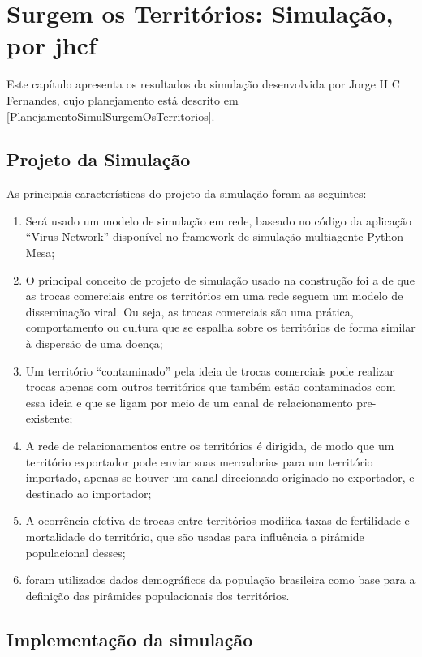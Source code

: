 \chapter{Surgem os Territórios: Simulação, por jhcf}

Este capítulo apresenta os resultados da simulação desenvolvida por Jorge H C Fernandes, cujo planejamento está descrito em \ref{PlanejamentoSimulSurgemOsTerritorios}.

\section{Projeto da Simulação}

As principais características do projeto da simulação foram as seguintes:
\begin{enumerate}
    \item Será usado um modelo de simulação em rede, baseado no código da aplicação ``Virus Network'' disponível no framework de simulação multiagente Python Mesa;
    \item O principal conceito de projeto de simulação usado na construção foi a de que as trocas comerciais entre os territórios em uma rede seguem um modelo de disseminação viral. Ou seja, as trocas comerciais são uma prática, comportamento ou cultura que se espalha sobre os territórios de forma similar à dispersão de uma doença;
    \item Um território ``contaminado'' pela ideia de trocas comerciais pode realizar trocas apenas com outros territórios que também estão contaminados com essa ideia e que se ligam por meio de um canal de relacionamento pre-existente;
    \item A rede de relacionamentos entre os territórios é dirigida, de modo que um território exportador pode enviar suas mercadorias para um território importado, apenas se houver um canal direcionado originado no exportador, e destinado ao importador;
    \item A ocorrência efetiva de trocas entre territórios modifica taxas de fertilidade e mortalidade do território, que são usadas para influência a pirâmide populacional desses;
    \item foram utilizados dados demográficos da população brasileira como base para a definição das pirâmides populacionais dos territórios.
\end{enumerate}

\section{Implementação da simulação}

